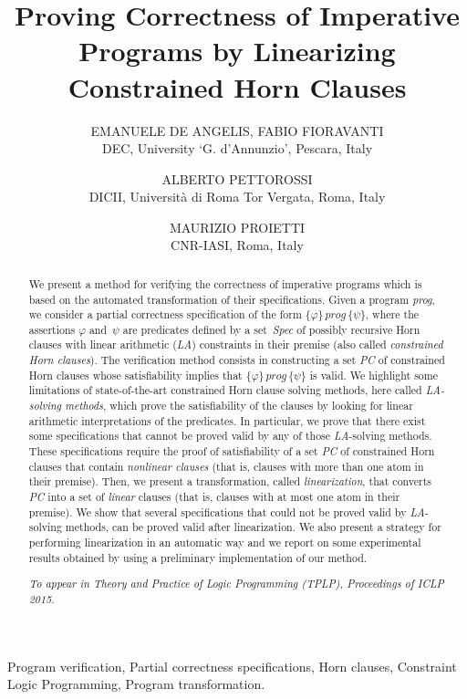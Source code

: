\documentclass[english]{tlp}
\title{Proving Correctness of Imperative Programs by Linearizing Constrained Horn Clauses}
\author[E. De~Angelis, F. Fioravanti, A. Pettorossi, M. Proietti]
{EMANUELE DE ANGELIS, FABIO FIORAVANTI\\
DEC, University `G. d'Annunzio', Pescara, Italy\\
\email{\{emanuele.deangelis,fabio.fioravanti\}@unich.it}
\and
ALBERTO PETTOROSSI\\
DICII, Universit\`a di Roma Tor Vergata, Roma, Italy\\
\email{pettorossi@disp.uniroma2.it}
\and
MAURIZIO PROIETTI\\
CNR-IASI, Roma, Italy\\
\email{maurizio.proietti@iasi.cnr.it} 
}
\begin{document}
\pagestyle{plain}


\maketitle

\begin{abstract}
We present a method for verifying the correctness of 
imperative programs which is based on the automated transformation 
of their specifications.
Given a program \textit{prog}, we consider a partial correctness 
specification of the form
$\{\varphi\}\, \textit{prog}\, \{\psi\}$,
where the assertions $\varphi $ and~$\psi$ are predicates
defined by a set~\textit{Spec} of possibly recursive 
Horn clauses with linear arithmetic ({\it LA})
constraints in their premise (also called {\it constrained Horn clauses}).
The verification method consists in
constructing  a set \textit{PC} of constrained Horn clauses
whose satisfiability implies that $\{\varphi\}\, \textit{prog}\, 
\{\psi\}$ is valid.
We highlight some limitations of state-of-the-art constrained Horn clause solving
methods, here called {\it{LA-solving methods}}, 
which prove the satisfiability of the clauses  by looking for linear arithmetic interpretations of the 
predicates. 
In particular, we prove that there exist some specifications 
that cannot be 
proved valid by any of those {\it LA}-solving methods. 
These specifications require the proof
of satisfiability of a set \textit{PC} of constrained Horn clauses that contain
{\it nonlinear clauses} (that is, clauses with more than one atom in their premise).
Then, we present a transformation, called {\it linearization}, that 
converts \textit{PC} into
a set of {\it linear} clauses (that is, clauses with at most one 
atom in their premise).
We show that several specifications 
that could not be proved valid by  {\it LA}-solving  methods,
can be proved valid after linearization.
We also present a strategy for performing linearization in an automatic way and
we report on some experimental results obtained by using a preliminary implementation
of our method.

\medskip

\noindent
{\em To appear in Theory and Practice of Logic Programming (TPLP), Proceedings of ICLP 2015.}

\end{abstract}


\begin{keywords}
Program verification,
Partial  correctness specifications,
Horn clauses,
Constraint Logic Programming,
Program transformation.\vspace{-2mm}
\end{keywords}
\end{document}
